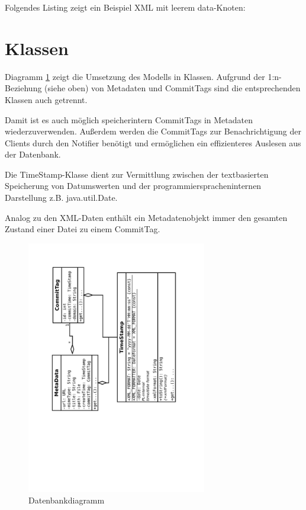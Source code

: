 Folgendes Listing zeigt ein Beispiel XML mit leerem data-Knoten:


\section{Klassen} \label{design:data:classes}
Diagramm \ref{dia:design:frontend:data:classes} zeigt die Umsetzung des Modells in Klassen.
Aufgrund der 1:n-Beziehung (siehe oben) von Metadaten und CommitTags sind die entsprechenden
Klassen auch getrennt.

Damit ist es auch möglich speicherintern CommitTags in Metadaten wiederzuverwenden.
Außerdem werden die CommitTags zur Benachrichtigung der Clients durch den Notifier benötigt
und ermöglichen ein effizienteres Auslesen aus der Datenbank.

Die TimeStamp-Klasse dient zur Vermittlung zwischen der textbasierten Speicherung von Datumswerten und der
programmierspracheninternen Darstellung z.B. java.util.Date.

Analog zu den XML-Daten enthält ein Metadatenobjekt immer den gesamten Zustand einer Datei zu einem CommitTag.

\begin{figure}[h]
	\centering
	\label{dia:design:frontend:data:classes}
	\includegraphics[width=0.7\textwidth, angle=270]{design/data/model.pdf}
	\caption{Datenbankdiagramm}
\end{figure}

